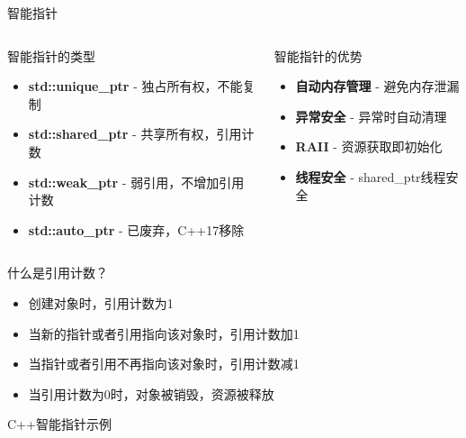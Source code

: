 \documentclass[UTF8,aspectratio=169]{beamer}
\begin{document}
\begin{frame}{智能指针}
    \begin{columns}
        \begin{column}{0.58\textwidth}
        \begin{ytublock}{智能指针的类型}
        \begin{itemize}
            \item \textbf{std::unique\_ptr} - 独占所有权，不能复制
            \item \textbf{std::shared\_ptr} - 共享所有权，引用计数
            \item \textbf{std::weak\_ptr} - 弱引用，不增加引用计数
            \item \textbf{std::auto\_ptr} - 已废弃，C++17移除
        \end{itemize}
        \end{ytublock}
        \end{column}
        \begin{column}{0.38\textwidth}
        \begin{ytublock}{智能指针的优势}
            \begin{itemize}
                \item \textbf{自动内存管理} - 避免内存泄漏
                \item \textbf{异常安全} - 异常时自动清理
                \item \textbf{RAII} - 资源获取即初始化
                \item \textbf{线程安全} - shared\_ptr线程安全
            \end{itemize}
        \end{ytublock}
        \end{column}
    \end{columns}
    \begin{ytublock}{什么是引用计数？}
        \begin{itemize}
            \item 创建对象时，引用计数为1
            \item 当新的指针或者引用指向该对象时，引用计数加1
            \item 当指针或者引用不再指向该对象时，引用计数减1
            \item 当引用计数为0时，对象被销毁，资源被释放
        \end{itemize}
    \end{ytublock}
\end{frame}

\begin{frame}[fragile]{C++智能指针示例}
    \begin{columns}
        \begin{column}{0.48\textwidth}
            \inputminted[firstline=1,lastline=18]{cpp}{code/cpp_smart_pointer_clean.cpp}
        \end{column}
        \begin{column}{0.48\textwidth}
            \inputminted[firstline=19,lastline=35]{cpp}{code/cpp_smart_pointer_clean.cpp}
        \end{column}
    \end{columns}
\end{frame}
\end{document}

